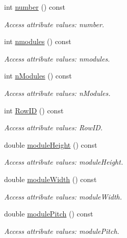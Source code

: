 \begin{DoxyCompactItemize}
int \hyperlink{struct_d_d4hep_1_1_x_m_l_1_1_dimension_a3130e131f0fca55ce5448bd89a358477}{number} () const
\begin{DoxyCompactList}\small\item\em Access attribute values\+: number. \end{DoxyCompactList}\item 
int \hyperlink{struct_d_d4hep_1_1_x_m_l_1_1_dimension_a174bf93cec66fce9e6a2a08c989a73f4}{nmodules} () const
\begin{DoxyCompactList}\small\item\em Access attribute values\+: nmodules. \end{DoxyCompactList}\item 
int \hyperlink{struct_d_d4hep_1_1_x_m_l_1_1_dimension_a51d6675dbd056544a2208a42c1032965}{n\+Modules} () const
\begin{DoxyCompactList}\small\item\em Access attribute values\+: n\+Modules. \end{DoxyCompactList}\item 
int \hyperlink{struct_d_d4hep_1_1_x_m_l_1_1_dimension_a680c172eb2e88e5cbd8db35fd3763f06}{Row\+ID} () const
\begin{DoxyCompactList}\small\item\em Access attribute values\+: Row\+ID. \end{DoxyCompactList}\item 
double \hyperlink{struct_d_d4hep_1_1_x_m_l_1_1_dimension_ad4325caee0d536a441adf8e1eaa4ec14}{module\+Height} () const
\begin{DoxyCompactList}\small\item\em Access attribute values\+: module\+Height. \end{DoxyCompactList}\item 
double \hyperlink{struct_d_d4hep_1_1_x_m_l_1_1_dimension_a84490ea1bc8bd6f25022ee9838421b64}{module\+Width} () const
\begin{DoxyCompactList}\small\item\em Access attribute values\+: module\+Width. \end{DoxyCompactList}\item 
double \hyperlink{struct_d_d4hep_1_1_x_m_l_1_1_dimension_ab5aad26bedb5baea6d013919f0205aae}{module\+Pitch} () const
\begin{DoxyCompactList}\small\item\em Access attribute values\+: module\+Pitch. \end{DoxyCompactList}\item 

\end{DoxyCompactItemize}
